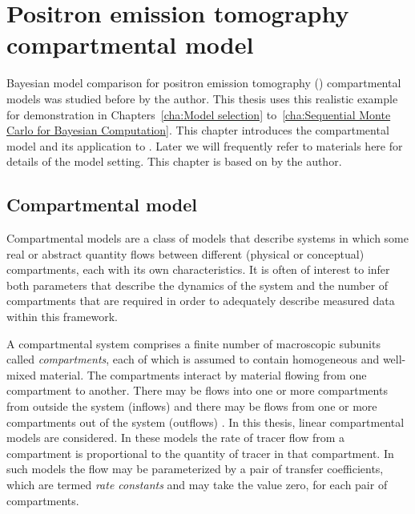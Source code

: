 \chapter{Positron emission tomography compartmental model}
\label{cha:Positron emission tomography compartmental model}

Bayesian model comparison for positron emission tomography (\pet)
compartmental models was studied before by the author. This thesis uses this
realistic example for demonstration in Chapters~\ref{cha:Model selection}
to~\ref{cha:Sequential Monte Carlo for Bayesian Computation}. This chapter
introduces the compartmental model and its application to \pet. Later we will
frequently refer to materials here for details of the model setting. This
chapter is based on \cite{Zhou2013} by the author.

\section{Compartmental model}
\label{sec:Compartmental model}

Compartmental models are a class of models that describe systems in which
some real or abstract quantity flows between different (physical or
conceptual) compartments, each with its own characteristics. It is often of
interest to infer both parameters that describe the dynamics of the system
and the number of compartments that are required in order to adequately
describe measured data within this framework.

A compartmental system comprises a finite number of macroscopic subunits
called \emph{compartments}, each of which is assumed to contain homogeneous
and well-mixed material. The compartments interact by material flowing from
one compartment to another. There may be flows into one or more compartments
from outside the system (inflows) and there may be flows from one or more
compartments out of the system (outflows) \cite{Jacquez:1996gc}. In this
thesis, linear compartmental models are considered. In these models the rate
of tracer flow from a compartment is proportional to the quantity of tracer
in that compartment. In such models the flow may be parameterized by a pair
of transfer coefficients, which are termed \emph{rate constants} and may take
the value zero, for each pair of compartments.

